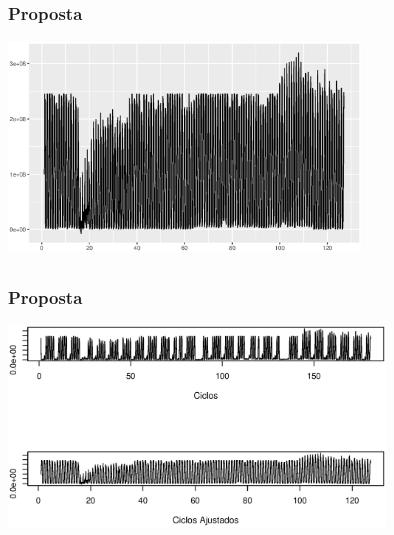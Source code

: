 \documentclass[aspectratio=169]{beamer}
\begin{document}
\subsection{}
\begin{frame}
\frametitle{Proposta}

        \centering
\includegraphics[width=0.7\textwidth,angle=0]{mytsClean.eps}
\end{frame}

\subsection{}
\begin{frame}
\frametitle{Proposta}

        \centering
\includegraphics[width=0.75\textwidth,angle=0]{cicloOrig_Ajustado.eps}
\end{frame}
\end{document}
